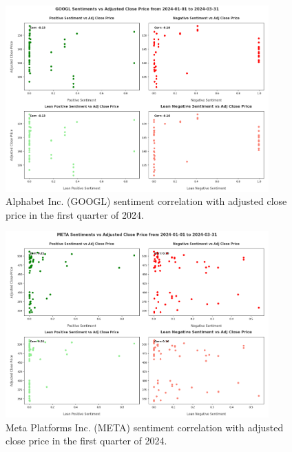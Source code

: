 \begin{figure}[htbp]
  \centering
  \includegraphics[width=0.9\textwidth]{img/experiment-stock/googl-corr-a.pdf}
  \caption{Alphabet Inc. (GOOGL) sentiment correlation with adjusted close price in the first quarter of 2024.}
  \label{fig:elsa-experiment-stock-googl-corr}
\end{figure}

\begin{figure}[htbp]
    \centering
    \includegraphics[width=0.9\textwidth]{img/experiment-stock/meta-corr-a.pdf}
    \caption{Meta Platforms Inc. (META) sentiment correlation with adjusted close price in the first quarter of 2024.}
    \label{fig:elsa-experiment-stock-meta-corr}
\end{figure}

